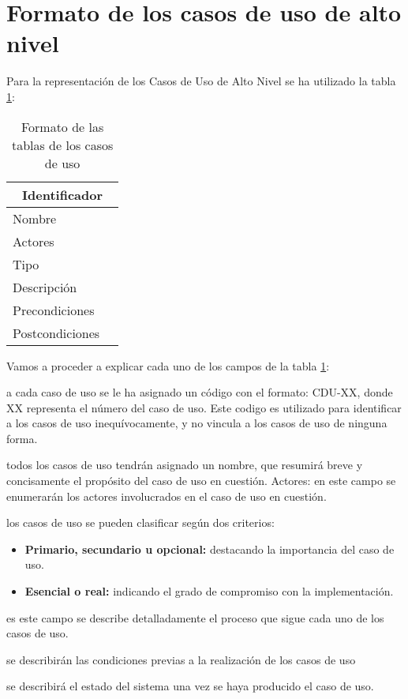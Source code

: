 \section{Formato de los casos de uso de alto nivel} \label{sec:CDUaltoFormat}

\par Para la representación de los Casos de Uso de Alto Nivel se ha utilizado la tabla \ref{tab:formatoCDU}:

\begin{table}[h]
\begin{center}
\begin{tabular}{p{} p{11cm}}
\multicolumn{2}{c}{\textbf{Identificador} } \\ \hline \hline
Nombre &  \\ \hline
Actores &  \\ \hline
Tipo & \\ \hline
Descripción &  \\ \hline
Precondiciones &  \\ \hline
Postcondiciones &  \\ \hline
\end{tabular}
\caption{Formato de las tablas de los casos de uso}
\label{tab:formatoCDU}
\end{center}
\end{table}

\par Vamos a proceder a explicar cada uno de los campos de la tabla \ref{tab:formatoCDU}:

\begin{description}[style=multiline, leftmargin=4cm]
  \item[\textbf{Identificador:}] a cada caso de uso se le ha asignado un código con el formato: CDU-XX, donde XX representa el número del caso de uso. Este codigo es utilizado para identificar a los casos de uso inequívocamente, y no vincula a los casos de uso de ninguna forma.
  \item[\textbf{Nombre:}] todos los casos de uso tendrán asignado un nombre, que resumirá breve y concisamente el propósito del caso de uso en cuestión.
  Actores: en este campo se enumerarán los actores involucrados en el caso de uso en cuestión.
  \item[\textbf{Tipo:}] los casos de uso se pueden clasificar según dos criterios:
  \begin{itemize}[-]
    \item \textbf{Primario, secundario u opcional:} destacando la importancia del caso de uso.
    \item \textbf{Esencial o real:} indicando el grado de compromiso con la implementación.
  \end{itemize}
  \item[\textbf{Descripción:}] es este campo se describe detalladamente el proceso que sigue cada uno de los casos de uso.
  \item[\textbf{Precondiciones:}] se describirán las condiciones previas a la realización de los casos de uso
  \item[\textbf{Postcondiciones:}] se describirá el estado del sistema una vez se haya producido el caso de uso.
\end{description}
